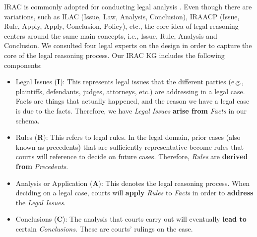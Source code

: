IRAC is commonly adopted for conducting legal analysis \cite{Burton2017ThinkLikeALawyer}. Even though there are variations, such as ILAC (Issue, Law, Analysis, Conclusion), IRAACP (Issue, Rule, Apply, Apply, Conclusion, Policy), etc., the core idea of legal reasoning centers around the same main concepts, i.e., Issue, Rule, Analysis and Conclusion. We consulted four legal experts on the design in order to capture the core of the legal reasoning process. Our IRAC KG includes the following components:
\begin{itemize}
  \item Legal Issues (\textbf{I}): This represents legal issues that the different parties (e.g., plaintiffs, defendants, judges, attorneys, etc.) are addressing in a legal case. Facts are things that actually happened, and the reason we have a legal case is due to the facts. Therefore, we have \textit{Legal Issues} \textbf{arise from} \textit{Facts} in our schema.
  \item Rules (\textbf{R}): This refers to legal rules. In the legal domain, prior cases (also known as precedents) that are sufficiently representative become rules that courts will reference to decide on future cases. Therefore, \textit{Rules} are \textbf{derived from} \textit{Precedents}.
  \item Analysis or Application (\textbf{A}): This denotes the legal reasoning process. When deciding on a legal case, courts will \textbf{apply} \textit{Rules} to \textit{Facts} in order to \textbf{address} the \textit{Legal Issues}.
  \item Conclusions (\textbf{C}): The analysis that courts carry out will eventually \textbf{lead to} certain \textit{Conclusions}. These are courts' rulings on the case.
\end{itemize}
